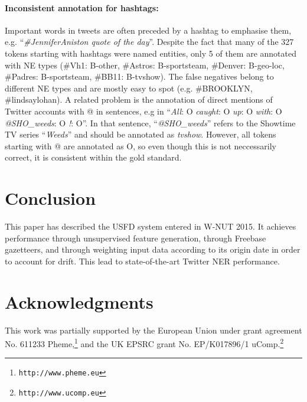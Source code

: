\documentclass[11pt|a4paper]{article}
\begin{document}
\paragraph{Inconsistent annotation for hashtags:} Important words in tweets are often preceded by a hashtag to emphasise them, e.g. ``{\em \#JenniferAniston quote of the day}''. Despite the fact that many of the 327 tokens starting with hashtags were named entities, only 5 of them are annotated with NE types (\#Vh1: B-other, \#Astros: B-sportsteam, \#Denver: B-geo-loc, \#Padres: B-sportsteam, \#BB11: B-tvshow). The false negatives belong to different NE types and are mostly easy to spot (e.g. \#BROOKLYN, \#lindsaylohan). A related problem is the annotation of direct mentions of Twitter accounts with @ in sentences, e.g in ``{\em All}: O {\em caught}: O {\em up}: O {\em with}: O {\em @SHO\_weeds}: O {\em !}: O''. In that sentence, ``{\em @SHO\_weeds}'' refers to the Showtime TV series ``{\em Weeds}'' and should be annotated as \textit{tvshow}. However, all tokens starting with @ are annotated as O, so even though this is not neccessarily correct, it is consistent within the gold standard.


\section{Conclusion}
This paper has described the USFD system entered in W-NUT 2015.
It achieves performance through unsupervised feature generation, through Freebase gazetteers, and through weighting input data according to its origin date in order to account for drift.
This lead to state-of-the-art Twitter NER performance.

\section*{Acknowledgments}
This work was partially supported by the European Union under grant agreement No. 611233 {\sc Pheme},\footnote{\texttt{http://www.pheme.eu}} and the UK EPSRC grant No. EP/K017896/1 uComp.\footnote{\texttt{http://www.ucomp.eu}}



\end{document}
